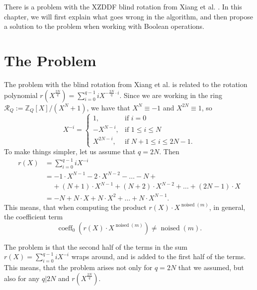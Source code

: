 
There is a problem with the XZDDF blind rotation from Xiang et al. \cite{cite:fast_bootstrap_crypto23}. In this chapter, we will first explain what goes wrong in the algorithm, and then propose a solution to the problem when working with Boolean operations.


\section{The Problem}

The problem with the blind rotation from Xiang et al. \cite{cite:fast_bootstrap_crypto23} is related to the rotation polynomial $r(X^{\frac{2N}{q}}) = \sum_{i=0}^{q-1} iX^{- \frac{2N}{q} \cdot i}$. Since we are working in the ring \linebreak $\mathcal{R}_Q := \mathbb{Z}_Q[X]/(X^N+1)$, we have that $X^N \equiv -1$ and $X^{2N} \equiv 1$, so
\begin{equation*}
  X^{-i} =
    \begin{cases}
      1, & \text{if $i=0$} \\
      -X^{N-i}, & \text{if $1 \leq i \leq N$}\\
      X^{2N-i}, & \text{if $N+1 \leq i \leq 2N-1$}.
    \end{cases}       
\end{equation*}
To make things simpler, let us assume that $q=2N$. Then
\begin{align*}
    r(X) &= \sum_{i=0}^{q-1} iX^{-i} \\
    &= -1 \cdot X^{N-1} -2 \cdot X^{N-2} - \dots - N + \\
    & \;\;\;\; + (N+1) \cdot X^{N-1} + (N+2) \cdot X^{N-2} + \dots + (2N-1) \cdot X \\
    & = -N + N \cdot X + N \cdot X^2 + \dots + N \cdot X^{N-1}.
\end{align*}
This means, that when computing the product $r(X) \cdot X^{\operatorname{noised}(m)}$, in general, the coefficient term
$$\operatorname{coeff}_0 \left(r(X) \cdot X^{\operatorname{noised}(m)}\right) \neq \operatorname{noised}(m).$$

The problem is that the second half of the terms in the sum $r(X) = \sum_{i=0}^{q-1} iX^{-i}$ wraps around, and is added to the first half of the terms. This means, that the problem arises not only for $q=2N$ that we assumed, but also for any $q|2N$ and $r(X^{\frac{2N}{q}})$.

